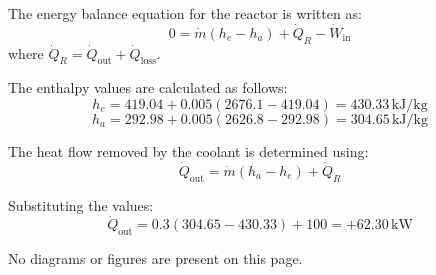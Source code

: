 The energy balance equation for the reactor is written as:  
\[
0 = \dot{m} \left( h_e - h_a \right) + \dot{Q}_R - \dot{W}_{\text{in}}
\]  
where \( \dot{Q}_R = \dot{Q}_{\text{out}} + \dot{Q}_{\text{loss}} \).  

The enthalpy values are calculated as follows:  
\[
h_e = 419.04 + 0.005 \left( 2676.1 - 419.04 \right) = 430.33 \, \text{kJ/kg}
\]  
\[
h_a = 292.98 + 0.005 \left( 2626.8 - 292.98 \right) = 304.65 \, \text{kJ/kg}
\]  

The heat flow removed by the coolant is determined using:  
\[
\dot{Q}_{\text{out}} = \dot{m} \left( h_a - h_e \right) + \dot{Q}_R
\]  

Substituting the values:  
\[
\dot{Q}_{\text{out}} = 0.3 \left( 304.65 - 430.33 \right) + 100 = +62.30 \, \text{kW}
\]  

No diagrams or figures are present on this page.